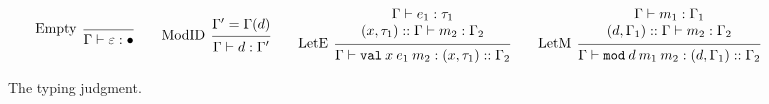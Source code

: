 \documentclass{article}
\theoremstyle{definition}
\newcommand*{\cons}{::}
\newcommand*{\modid}{d}
\newcommand*{\Lete}{\mathtt{val}}
\newcommand*{\Letm}{\mathtt{mod}}
\begin{document}
\begin{figure}[h!]
	\[
		\begin{prooftree}
			\infer[left label=Empty]0{
			\Gamma\vdash\varepsilon:\bullet
			}
		\end{prooftree}\qquad
		\begin{prooftree}
			\hypo{\Gamma'=\Gamma(\modid)}
			\infer[left label=ModID]1{
			\Gamma\vdash\modid:\Gamma'
			}
		\end{prooftree}\qquad
		\begin{prooftree}
			\hypo{
				\begin{matrix}
					\Gamma\vdash e_1:\tau_1 \\
					(x, \tau_1)\cons\Gamma\vdash m_2:\Gamma_2
				\end{matrix}
			}
			\infer[left label=LetE]1{
			\Gamma\vdash\Lete\:x\:e_1\:m_2:(x,\tau_1)\cons\Gamma_2
			}
		\end{prooftree}\qquad
		\begin{prooftree}
			\hypo{
				\begin{matrix}
					\Gamma\vdash m_1:\Gamma_1 \\
					(\modid, \Gamma_1)\cons\Gamma\vdash m_2:\Gamma_2
				\end{matrix}
			}
			\infer[left label=LetM]1{
			\Gamma\vdash\Letm\:\modid\:m_{1}\:m_{2}:(\modid,\Gamma_1)\cons\Gamma_2
			}
		\end{prooftree}
	\]
	\caption{The typing judgment.}
	\label{fig:typjudge}
\end{figure}
\end{document}
